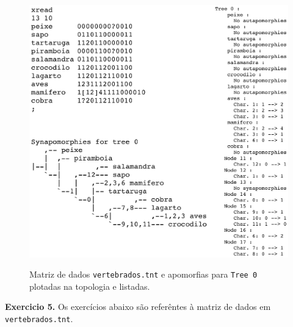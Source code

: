 \begin{refsection}
  \begin{figure}[H]
       \centering
      {\includegraphics[scale=0.80]{figures/tut5/vertebrados_apo_tree_0.eps}}
	{\caption[Apomorfias para \texttt{Tree 0} em \texttt{vertebrados.tnt}]{Matriz de dados \texttt{vertebrados.tnt} e apomorfias para \texttt{Tree 0} plotadas na topologia e listadas.}\label{tut5:fig:apo_tree0}} 
  \end{figure}



\begin{blackBlock}{\textbf{Exercicio 5.}}\label{tut4:ex:5.4}
	Os exercícios abaixo são referêntes à matriz de dados em \texttt{vertebrados.tnt}.
\end{blackBlock}



\end{refsection}
